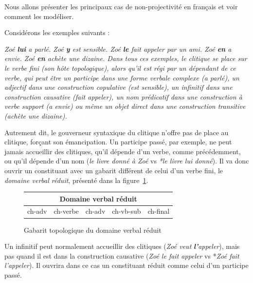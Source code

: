 \largerpage
{}
{Nous allons présenter les principaux cas de non-projectivité en français et voir comment les modéliser.

Considérons les exemples suivants :

\ea
\ea \itshape Zoé \textbf{lui} a parlé.
\ex \itshape Zoé \textbf{y}   est sensible.
\ex \itshape Zoé \textbf{le}  fait appeler par un ami.
\ex \itshape Zoé \textbf{en}  a envie.
\ex \itshape Zoé \textbf{en}  achète une dizaine.
\z
\z
Dans tous ces exemples, le clitique se place sur le verbe fini (son hôte topologique), alors qu’il est régi par un dépendant de ce verbe, qui peut être un participe dans une forme verbale complexe (\textit{a parlé}), un adjectif dans une construction copulative (\textit{est sensible}), un infinitif dans une construction causative (\textit{fait appeler}), un nom prédicatif dans une construction à verbe support (\textit{a envie}) ou même un objet direct dans une construction transitive (\textit{achète une dizaine}).

Autrement dit, le gouverneur syntaxique du clitique n’offre pas de place au clitique, forçant son émancipation. Un participe passé, par exemple, ne peut jamais accueillir des clitiques, qu’il dépende d’un verbe, comme précédemment, ou qu’il dépende d’un nom (\textit{le livre donné à Zoé} vs \textit{*le livre lui donné}). Il va donc ouvrir un constituant avec un gabarit différent de celui d’un verbe fini, le \textit{domaine verbal réduit}, présenté dans la figure~\ref{fig:gabarit-verbal-reduit}.

\begin{figure}[H]
\caption{\label{fig:gabarit-verbal-reduit}Gabarit topologique du domaine verbal réduit}
\def\arraystretch{1.5}
\setlength{\tabcolsep}{3ex}
\begin{tabular}{|c|c|c|c|c|}
\hline
\multicolumn{5}{|c|}{\cellcolor{lsDOIGray}Domaine verbal réduit}\\
\hline
ch-adv & \cellcolor{lsDOIGray}ch-verbe & ch-adv & ch-vb-sub & ch-final\\
\hline
\end{tabular}
\end{figure}

Un infinitif peut normalement accueillir des clitiques (\textit{Zoé veut} \textbf{\textit{l’}}\textit{appeler}), mais pas quand il est dans la construction causative (\textit{Zoé le fait appeler} vs *\textit{Zoé fait l'appeler}). Il ouvrira dans ce cas un constituant réduit comme celui d’un participe passé.

}
